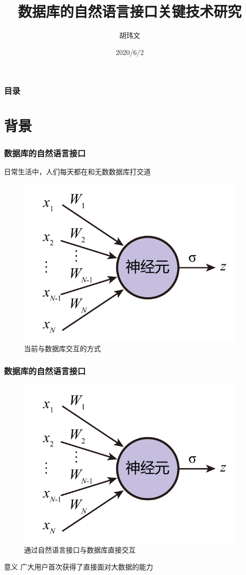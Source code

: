 \documentclass{ctexbeamer}
\title[数据库的自然语言接口]{数据库的自然语言接口关键技术研究}
\author{胡玮文}
\institute[SCUT]{华南理工大学}
\date{2020/6/2}
\begin{document}
\frame{\titlepage}
\logo{}



\begin{frame}
  \frametitle{目录}
  \tableofcontents
\end{frame}

\section{背景}
\begin{frame}
  \frametitle{数据库的自然语言接口}
  日常生活中，人们每天都在和无数数据库打交道
  \begin{figure}[]
    \includegraphics[page=12]{figure/figures.pdf}
    \caption{当前与数据库交互的方式}
  \end{figure}
\end{frame}
\begin{frame}
  \frametitle{数据库的自然语言接口}
  \begin{figure}
    \includegraphics[page=11]{figure/figures.pdf}
    \caption{通过自然语言接口与数据库直接交互}
  \end{figure}
  \begin{block}{意义}
    广大用户首次获得了直接面对大数据的能力
  \end{block}
\end{frame}
\end{document}
